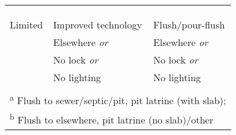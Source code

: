 \begin{table}[ht]
\begin{tabular}[t]{lll}
\hspace{1em}\cellcolor{gray!6}{} & \cellcolor{gray!6}{Inside/next to compound} & \cellcolor{gray!6}{Inside/next to compound}\\
\hspace{1em}\cellcolor{gray!6}{} & \cellcolor{gray!6}{Outside and/or inside lock} & \cellcolor{gray!6}{Outside and/or inside lock}\\
\hspace{1em}\cellcolor{gray!6}{} & \cellcolor{gray!6}{Lighting} & \cellcolor{gray!6}{Lighting}\\
\hspace{1em}Limited & Improved technology & Flush/pour-flush\\
\hspace{1em} & Elsewhere \textit{or} & Elsewhere \textit{or}\\
\hspace{1em} & No lock \textit{or} & No lock \textit{or}\\
\hspace{1em} & No lighting & No lighting\\
\hspace{1em}\cellcolor{gray!6}{Unimproved} & \cellcolor{gray!6}{Unimproved technology} & \cellcolor{gray!6}{Pit latrine/other}\\
\bottomrule
\multicolumn{3}{l}{\rule{0pt}{1em}\textsuperscript{a} Flush to sewer/septic/pit, pit latrine (with slab);}\\
\multicolumn{3}{l}{\rule{0pt}{1em}\textsuperscript{b} Flush to elsewhere, pit latrine (no slab)/other}\\
\end{tabular}
\end{table}